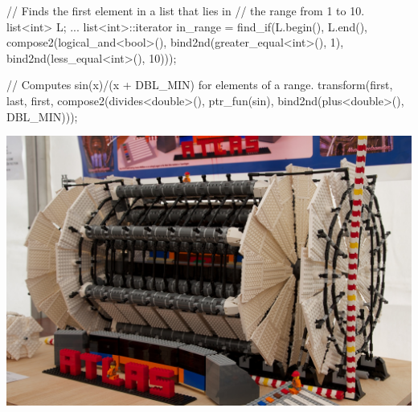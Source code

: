 \begin{frame}[fragile]
  \begin{cppcode}
    // Finds the first element in a list that lies in
    // the range from 1 to 10.
    list<int> L;
    ...
    list<int>::iterator in_range = 
      find_if(L.begin(), L.end(),
              compose2(logical_and<bool>(),
                       bind2nd(greater_equal<int>(), 1),
                       bind2nd(less_equal<int>(), 10)));

    // Computes sin(x)/(x + DBL_MIN) for elements of a range.
    transform(first, last, first,
              compose2(divides<double>(),
                       ptr_fun(sin),
                       bind2nd(plus<double>(), DBL_MIN)));
  \end{cppcode}
\end{frame}

\begin{frame}[fragile]
  \begin{block}{}
    \includegraphics[width=\linewidth]{AtlasLego}
  \end{block}
\end{frame}

